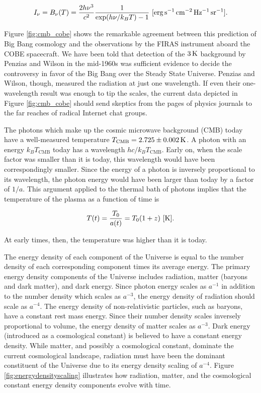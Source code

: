 \documentclass[a4paper,11pt]{article}
\begin{document}
\begin{align*}
    I_\nu = B_\nu(T) = \frac{2h\nu^3}{c^2} \frac{1}{\exp({h\nu/k_BT}) - 1} ~ [{\rm erg\,s^{-1}\,cm^{-2}\,Hz^{-1}\,sr^{-1}}].
\end{align*}

{\noindent}Figure \ref{fig:cmb_cobe} shows the remarkable agreement between this prediction of Big Bang cosmology and the observations by the FIRAS instrument aboard the COBE spacecraft. We have been told that detection of the $3\,{\rm K}$ background by Penzias and Wilson in the mid-1960s was sufficient evidence to decide the controversy in favor of the Big Bang over the Steady State Universe. Penzias and Wilson, though, measured the radiation at just one wavelength. If even their one-wavelength result was enough to tip the scales, the current data depicted in Figure \ref{fig:cmb_cobe} should send skeptics from the pages of physics journals to the far reaches of radical Internet chat groups.

{\noindent}The photons which make up the cosmic microwave background (CMB) today have a well-measured temperature $T_\mathrm{CMB} = 2.725 \pm 0.002\,{\rm K}$. A photon with an energy $k_BT_\mathrm{CMB}$ today has a wavelength $hc/k_BT_\mathrm{CMB}$. Early on, when the scale factor was smaller than it is today, this wavelength would have been correspondingly smaller. Since the energy of a photon is inversely proportional to its wavelength, the photon energy would have been larger than today by a factor of $1/a$. This argument applied to the thermal bath of photons implies that the temperature of the plasma as a function of time is

\begin{align*}
    T(t) = \frac{T_0}{a(t)} = T_0(1+z) ~ [{\rm K}].
\end{align*}

{\noindent}At early times, then, the temperature was higher than it is today.

{\noindent}The energy density of each component of the Universe is equal to the number density of each corresponding component times its average energy. The primary energy density components of the Universe includes radiation, matter (baryons and dark matter), and dark energy. Since photon energy scales as $a^{-1}$ in addition to the number density which scales as $a^{-3}$, the energy density of radiation should scale as $a^{-4}$. The energy density of non-relativistic particles, such as baryons, have a constant rest mass energy. Since their number density scales inversely proportional to volume, the energy density of matter scales as $a^{-3}$. Dark energy (introduced as a cosmological constant) is believed to have a constant energy density. While matter, and possibly a cosmological constant, dominate the current cosmological landscape, radiation must have been the dominant constituent of the Universe due to its energy density scaling of $a^{-4}$. Figure \ref{fig:energydensityscaling} illustrates how radiation, matter, and the cosmological constant energy density components evolve with time.
\end{document}

